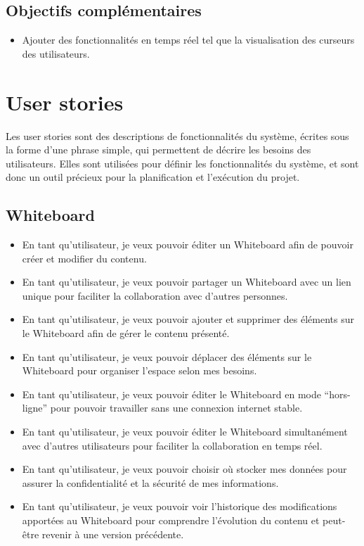 \subsection*{Objectifs \guillemotleft complémentaires\guillemotright}

\begin{itemize}
    \item Ajouter des fonctionnalités en temps réel tel que la visualisation des curseurs des utilisateurs.
\end{itemize}

\section*{User stories}
Les user stories sont des descriptions de fonctionnalités du système, écrites sous la forme d'une phrase simple, qui permettent de décrire les besoins des utilisateurs. Elles sont utilisées pour définir les fonctionnalités du système, et sont donc un outil précieux pour la planification et l'exécution du projet.

\subsection*{Whiteboard \label{sec:user-stories-whiteboard}}

\begin{itemize}
    \item En tant qu'utilisateur, je veux pouvoir éditer un Whiteboard afin de pouvoir créer et modifier du contenu.
    \item En tant qu'utilisateur, je veux pouvoir partager un Whiteboard avec un lien unique pour faciliter la collaboration avec d'autres personnes.
    \item En tant qu'utilisateur, je veux pouvoir ajouter et supprimer des éléments sur le Whiteboard afin de gérer le contenu présenté.
    \item En tant qu'utilisateur, je veux pouvoir déplacer des éléments sur le Whiteboard pour organiser l'espace selon mes besoins.
    \item En tant qu'utilisateur, je veux pouvoir éditer le Whiteboard en mode “hors-ligne” pour pouvoir travailler sans une connexion internet stable.
    \item En tant qu'utilisateur, je veux pouvoir éditer le Whiteboard simultanément avec d'autres utilisateurs pour faciliter la collaboration en temps réel.
    \item En tant qu'utilisateur, je veux pouvoir choisir où stocker mes données pour assurer la confidentialité et la sécurité de mes informations.
    \item En tant qu'utilisateur, je veux pouvoir voir l'historique des modifications apportées au Whiteboard pour comprendre l'évolution du contenu et peut-être revenir à une version précédente.
\end{itemize}

